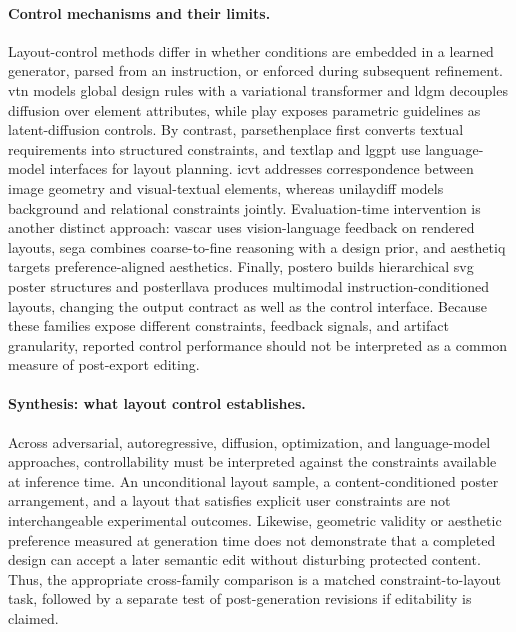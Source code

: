 \paragraph{Control mechanisms and their limits.}
Layout-control methods differ in whether conditions are embedded in a learned generator, parsed from an instruction, or enforced during subsequent refinement.
\ac{vtn} models global design rules with a variational transformer and \ac{ldgm} decouples diffusion over element attributes, while \ac{play} exposes parametric guidelines as latent-diffusion controls.
By contrast, \ac{parsethenplace} first converts textual requirements into structured constraints, and \ac{textlap} and \ac{lggpt} use language-model interfaces for layout planning.
\ac{icvt} addresses correspondence between image geometry and visual-textual elements, whereas \ac{unilaydiff} models background and relational constraints jointly.
Evaluation-time intervention is another distinct approach: \ac{vascar} uses vision-language feedback on rendered layouts, \ac{sega} combines coarse-to-fine reasoning with a design prior, and \ac{aesthetiq} targets preference-aligned aesthetics.
Finally, \ac{postero} builds hierarchical \ac{svg} poster structures and \ac{posterllava} produces multimodal instruction-conditioned layouts, changing the output contract as well as the control interface.
Because these families expose different constraints, feedback signals, and artifact granularity, reported control performance should not be interpreted as a common measure of post-export editing.

\paragraph{Synthesis: what layout control establishes.}
Across adversarial, autoregressive, diffusion, optimization, and language-model approaches, controllability must be interpreted against the constraints available at inference time.
An unconditional layout sample, a content-conditioned poster arrangement, and a layout that satisfies explicit user constraints are not interchangeable experimental outcomes.
Likewise, geometric validity or aesthetic preference measured at generation time does not demonstrate that a completed design can accept a later semantic edit without disturbing protected content.
Thus, the appropriate cross-family comparison is a matched constraint-to-layout task, followed by a separate test of post-generation revisions if editability is claimed.

